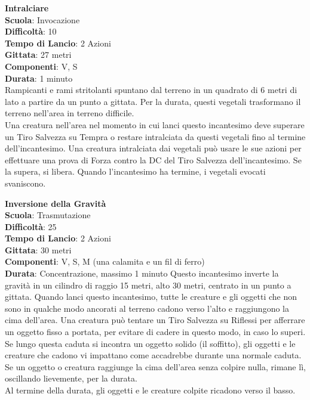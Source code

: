 \begin{multicols}{2}
\medskip\textbf{Intralciare}\\
\textbf{Scuola}: Invocazione\\
\textbf{Difficoltà}: 10\\
\textbf{Tempo di Lancio}: 2 Azioni\\
\textbf{Gittata}: 27 metri\\
\textbf{Componenti}: V, S\\
\textbf{Durata}: 1 minuto\\
Rampicanti e rami stritolanti spuntano dal terreno in un quadrato di 6 metri di lato a partire da un punto a gittata. Per la durata, questi vegetali trasformano il terreno nell'area in terreno difficile.\\
Una creatura nell'area nel momento in cui lanci questo incantesimo deve superare un Tiro Salvezza su Tempra o restare intralciata da questi vegetali fino al termine dell'incantesimo. Una creatura intralciata dai vegetali può usare le sue azioni per effettuare una prova di Forza contro la DC del Tiro Salvezza dell'incantesimo. Se la supera, si libera. Quando l'incantesimo ha termine, i vegetali evocati svaniscono.

\medskip\textbf{Inversione della Gravità}\\
\textbf{Scuola}: Trasmutazione\\
\textbf{Difficoltà}: 25\\
\textbf{Tempo di Lancio}: 2 Azioni\\
\textbf{Gittata}: 30 metri\\
\textbf{Componenti}: V, S, M (una calamita e un fil di ferro)\\
\textbf{Durata}: Concentrazione, massimo 1 minuto 
Questo incantesimo inverte la gravità in un cilindro di raggio 15 metri, alto 30 metri, centrato in un punto a gittata. Quando lanci questo incantesimo, tutte le creature e gli oggetti che non sono in qualche modo ancorati al terreno cadono verso l'alto e raggiungono la cima dell'area. Una creatura può tentare un Tiro Salvezza su Riflessi per afferrare un oggetto fisso a portata, per evitare di cadere in questo modo, in caso lo superi.\\
Se lungo questa caduta si incontra un oggetto solido (il soffitto), gli oggetti e le creature che cadono vi impattano come accadrebbe durante una normale caduta. Se un oggetto o creatura raggiunge la cima dell'area senza colpire nulla, rimane lì, oscillando lievemente, per la durata.\\
Al termine della durata, gli oggetti e le creature colpite ricadono verso il basso.


\end{multicols}

